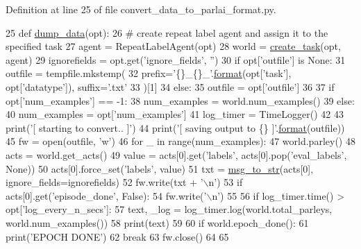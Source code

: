 Definition at line 25 of file convert\+\_\+data\+\_\+to\+\_\+parlai\+\_\+format.\+py.


\begin{DoxyCode}
25 \textcolor{keyword}{def }\hyperlink{namespaceparlai_1_1scripts_1_1convert__data__to__parlai__format_a4ed2278a6a86b341d814edbef295124c}{dump\_data}(opt):
26     \textcolor{comment}{# create repeat label agent and assign it to the specified task}
27     agent = RepeatLabelAgent(opt)
28     world = \hyperlink{namespaceparlai_1_1core_1_1worlds_a11923c10b545c7ecc1b08fe2242d9c2c}{create\_task}(opt, agent)
29     ignorefields = opt.get(\textcolor{stringliteral}{'ignore\_fields'}, \textcolor{stringliteral}{''})
30     \textcolor{keywordflow}{if} opt[\textcolor{stringliteral}{'outfile'}] \textcolor{keywordflow}{is} \textcolor{keywordtype}{None}:
31         outfile = tempfile.mkstemp(
32             prefix=\textcolor{stringliteral}{'\{\}\_\{\}\_'}.\hyperlink{namespaceparlai_1_1chat__service_1_1services_1_1messenger_1_1shared__utils_a32e2e2022b824fbaf80c747160b52a76}{format}(opt[\textcolor{stringliteral}{'task'}], opt[\textcolor{stringliteral}{'datatype'}]), suffix=\textcolor{stringliteral}{'.txt'}
33         )[1]
34     \textcolor{keywordflow}{else}:
35         outfile = opt[\textcolor{stringliteral}{'outfile'}]
36 
37     \textcolor{keywordflow}{if} opt[\textcolor{stringliteral}{'num\_examples'}] == -1:
38         num\_examples = world.num\_examples()
39     \textcolor{keywordflow}{else}:
40         num\_examples = opt[\textcolor{stringliteral}{'num\_examples'}]
41     log\_timer = TimeLogger()
42 
43     print(\textcolor{stringliteral}{'[ starting to convert.. ]'})
44     print(\textcolor{stringliteral}{'[ saving output to \{\} ]'}.\hyperlink{namespaceparlai_1_1chat__service_1_1services_1_1messenger_1_1shared__utils_a32e2e2022b824fbaf80c747160b52a76}{format}(outfile))
45     fw = open(outfile, \textcolor{stringliteral}{'w'})
46     \textcolor{keywordflow}{for} \_ \textcolor{keywordflow}{in} range(num\_examples):
47         world.parley()
48         acts = world.get\_acts()
49         value = acts[0].get(\textcolor{stringliteral}{'labels'}, acts[0].pop(\textcolor{stringliteral}{'eval\_labels'}, \textcolor{keywordtype}{None}))
50         acts[0].force\_set(\textcolor{stringliteral}{'labels'}, value)
51         txt = \hyperlink{namespaceparlai_1_1utils_1_1misc_ae5db473b41d3b49814e2566e866282b6}{msg\_to\_str}(acts[0], ignore\_fields=ignorefields)
52         fw.write(txt + \textcolor{stringliteral}{'\(\backslash\)n'})
53         \textcolor{keywordflow}{if} acts[0].get(\textcolor{stringliteral}{'episode\_done'}, \textcolor{keyword}{False}):
54             fw.write(\textcolor{stringliteral}{'\(\backslash\)n'})
55 
56         \textcolor{keywordflow}{if} log\_timer.time() > opt[\textcolor{stringliteral}{'log\_every\_n\_secs'}]:
57             text, \_log = log\_timer.log(world.total\_parleys, world.num\_examples())
58             print(text)
59 
60         \textcolor{keywordflow}{if} world.epoch\_done():
61             print(\textcolor{stringliteral}{'EPOCH DONE'})
62             \textcolor{keywordflow}{break}
63     fw.close()
64 
65 
\end{DoxyCode}
